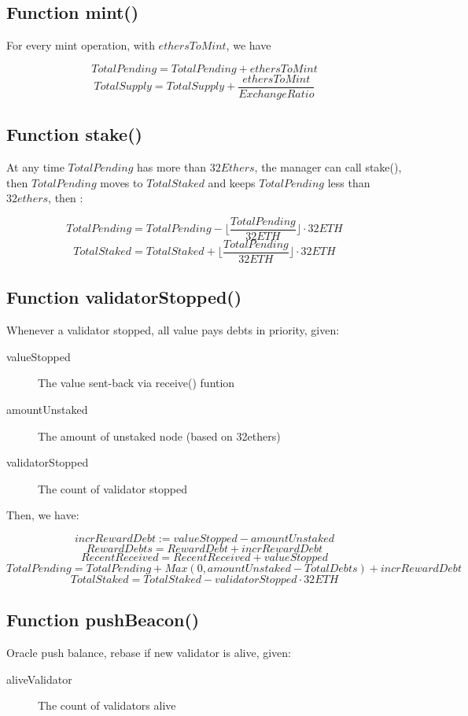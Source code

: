 \documentclass{article}
\begin{document}
\subsection{Function mint()}
For every mint operation, with $ethersToMint$, we have 

\begin{theorem}[Mint]
\label{Mint}
\[TotalPending = TotalPending + ethersToMint\]
\[TotalSupply = TotalSupply + \frac{ethersToMint}{ExchangeRatio}\]
\end{theorem}

\subsection{Function stake()}
At any time $TotalPending$ has more than $32 Ethers$, the manager can call stake(), then $TotalPending$ moves to $TotalStaked$ and keeps $TotalPending$ less than $32 ethers$, then :
\begin{theorem}[Stake]
\label{Mint}
\[TotalPending = TotalPending - \lfloor\frac{TotalPending}{32ETH}\rfloor \cdot 32ETH \]
\[TotalStaked = TotalStaked + \lfloor\frac{TotalPending}{32ETH}\rfloor \cdot 32ETH \]
\end{theorem}
\subsection{Function validatorStopped()}
Whenever a validator stopped, all value pays debts in priority, given:
\begin{description}
\item[valueStopped] The value sent-back via receive() funtion
\item[amountUnstaked] The amount of unstaked node (based on 32ethers)
\item[validatorStopped] The count of validator stopped
\end{description}

Then, we have:

\begin{theorem}[validatorStopped]
\label{validatorStopped}
\[incrRewardDebt := valueStopped - amountUnstaked\]
\[RewardDebts = RewardDebt + incrRewardDebt\]
\[RecentReceived = RecentReceived + valueStopped\]
\[TotalPending = TotalPending + Max(0, amountUnstaked - TotalDebts) + incrRewardDebt\]
\[TotalStaked = TotalStaked - validatorStopped \cdot 32 ETH\]
\end{theorem}

\subsection{Function pushBeacon()}
Oracle push balance, rebase if new validator is alive, given:
\begin{description}
\item[aliveValidator] The count of validators alive
\end{description}
\end{document}
